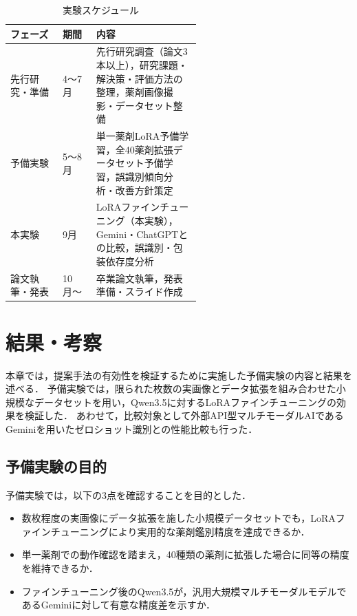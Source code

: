 \documentclass{jsarticle}
\begin{document}
\begin{table}[h]
\centering
\caption{実験スケジュール}
\label{tab:schedule}
\begin{tabular}{llp{0.55\linewidth}}
\hline
フェーズ & 期間 & 内容 \\
\hline
先行研究・準備 & 4〜7月 & 先行研究調査（論文3本以上），研究課題・解決策・評価方法の整理，薬剤画像撮影・データセット整備 \\
予備実験       & 5〜8月 & 単一薬剤LoRA予備学習，全40薬剤拡張データセット予備学習，誤識別傾向分析・改善方針策定 \\
本実験         & 9月    & LoRAファインチューニング（本実験），Gemini・ChatGPTとの比較，誤識別・包装依存度分析 \\
論文執筆・発表 & 10月〜 & 卒業論文執筆，発表準備・スライド作成 \\
\hline
\end{tabular}
\end{table}

\newpage

\section{結果・考察}\label{sec4}

本章では，提案手法の有効性を検証するために実施した予備実験の内容と結果を述べる．
予備実験では，限られた枚数の実画像とデータ拡張を組み合わせた小規模なデータセットを用い，Qwen3.5に対するLoRAファインチューニングの効果を検証した．
あわせて，比較対象として外部API型マルチモーダルAIであるGeminiを用いたゼロショット識別との性能比較も行った．

\subsection{予備実験の目的}

予備実験では，以下の3点を確認することを目的とした．

\begin{itemize}
  \item 数枚程度の実画像にデータ拡張を施した小規模データセットでも，LoRAファインチューニングにより実用的な薬剤鑑別精度を達成できるか．
  \item 単一薬剤での動作確認を踏まえ，40種類の薬剤に拡張した場合に同等の精度を維持できるか．
  \item ファインチューニング後のQwen3.5が，汎用大規模マルチモーダルモデルであるGeminiに対して有意な精度差を示すか．
\end{itemize}
\end{document}
